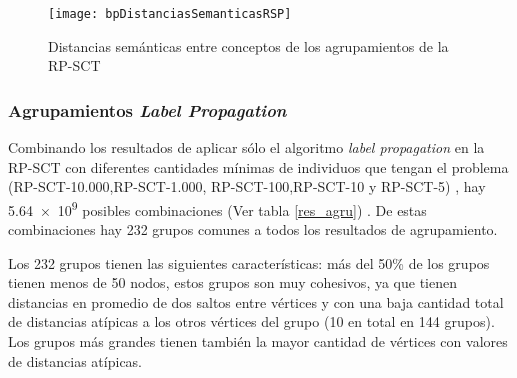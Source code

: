 \begin{figure}[ht]
\caption{Distancias semánticas entre conceptos de los agrupamientos de la \acrshort{RP-SCT}}
\label{fig:bpDistanciasSemanticasRSP}
\centering
\texttt{[image: bpDistanciasSemanticasRSP]}
\end{figure}

\subsubsection{Agrupamientos \textit{Label Propagation}}
Combinando los resultados de aplicar sólo el algoritmo \textit{label propagation} en la \acrshort{RP-SCT} con diferentes cantidades mínimas de individuos que tengan el problema (RP-SCT-10.000,RP-SCT-1.000, RP-SCT-100,RP-SCT-10 y RP-SCT-5) , hay \num{5.64e9} posibles combinaciones (Ver tabla \ref{res_agru}) .  De estas combinaciones hay 232 grupos comunes a todos los resultados de agrupamiento. 

Los 232 grupos tienen las siguientes características: más del 50\% de los grupos tienen menos de 50 nodos, estos grupos son muy cohesivos, ya que tienen distancias en promedio de dos saltos entre vértices y con una baja cantidad total de distancias atípicas a los otros vértices del grupo (10 en total en 144 grupos). Los grupos más grandes tienen también la mayor cantidad de vértices con valores de distancias atípicas.

